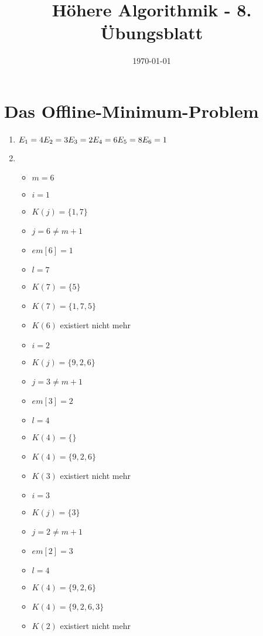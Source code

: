 \documentclass[a4paper,10pt]{article}
\title{H\"ohere Algorithmik - 8. \"Ubungsblatt}
\author{\Authors}
\date{\today}
\begin{document}
\maketitle

\section{Das Offline-Minimum-Problem}
\begin{enumerate}
	\item	\begin{math}
			E_1 = 4\\
			E_2 = 3\\
			E_3 = 2\\
			E_4 = 6\\
			E_5 = 8\\
			E_6 = 1
		\end{math}
	\item	\begin{itemize}
			\item 	$m = 6$
			\item	$i = 1$
			\item	$K(j) = \{1,7\}$
			\item	$j = 6 \neq m+1$
			\item	$em[6] = 1$
			\item	$l = 7$
			\item	$K(7) = \{5\}$
			\item	$K(7) = \{1,7,5\}$
			\item	$K(6)$ existiert nicht mehr
			\item	$i = 2$
			\item	$K(j) = \{9,2,6\}$
			\item	$j = 3 \neq m+1$
			\item	$em[3] = 2$
			\item	$l = 4$
			\item	$K(4) = \{\}$
			\item	$K(4) = \{9,2,6\}$
			\item	$K(3)$ existiert nicht mehr
			\item	$i = 3$
			\item	$K(j) = \{3\}$
			\item	$j = 2 \neq m+1$
			\item	$em[2] = 3$
			\item	$l = 4$
			\item	$K(4) = \{9,2,6\}$
			\item	$K(4) = \{9,2,6,3\}$
			\item	$K(2)$ existiert nicht mehr

\end{itemize}
\end{enumerate}
\end{document}
